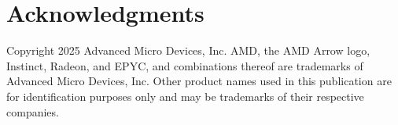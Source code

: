 \documentclass[acmtog,natbib=false]{acmart}
\begin{document}

\section*{Acknowledgments}
Copyright 2025 Advanced Micro Devices, Inc.
AMD, the AMD Arrow logo, Instinct, Radeon, and EPYC, and combinations thereof are trademarks of Advanced Micro Devices, Inc.
Other product names used in this publication are for identification purposes only and may be trademarks of their respective companies.

\printbibliography
\end{document}
